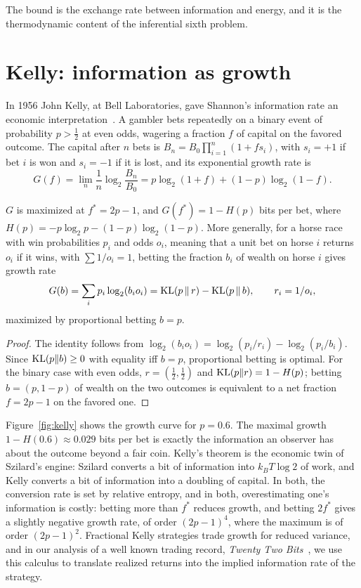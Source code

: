 The bound is the exchange rate between information and energy, and it is the thermodynamic content of the inferential sixth problem.

\section{Kelly: information as growth}

In 1956 John Kelly, at Bell Laboratories, gave Shannon's information rate an economic interpretation~\cite{kelly1956}. A gambler bets repeatedly on a binary event of probability $p>\frac12$ at even odds, wagering a fraction $f$ of capital on the favored outcome. The capital after $n$ bets is $B_n = B_0\prod_{i=1}^n(1+fs_i)$, with $s_i = +1$ if bet $i$ is won and $s_i = -1$ if it is lost, and its exponential growth rate is
\[
G(f) = \lim_n\frac1n\log_2\frac{B_n}{B_0} = p\log_2(1+f)+(1-p)\log_2(1-f).
\]

\begin{theorem}[Kelly]\label{thm:kelly}
$G$ is maximized at $f^* = 2p-1$, and $G(f^*) = 1-H(p)$ bits per bet, where $H(p) = -p\log_2p-(1-p)\log_2(1-p)$. More generally, for a horse race with win probabilities $p_i$ and odds $o_i$, meaning that a unit bet on horse $i$ returns $o_i$ if it wins, with $\sum1/o_i = 1$, betting the fraction $b_i$ of wealth on horse $i$ gives growth rate
\[
G(b) = \sum_ip_i\log_2(b_io_i) = \mathrm{KL}(p\,\|\,r)-\mathrm{KL}(p\,\|\,b),\qquad r_i = 1/o_i,
\]
maximized by proportional betting $b = p$.
\end{theorem}

\begin{proof}
The identity follows from $\log_2(b_io_i) = \log_2(p_i/r_i)-\log_2(p_i/b_i)$. Since $\mathrm{KL}(p\|b)\geq0$ with equality iff $b = p$, proportional betting is optimal. For the binary case with even odds, $r = (\frac12,\frac12)$ and $\mathrm{KL}(p\|r) = 1-H(p)$; betting $b = (p,1-p)$ of wealth on the two outcomes is equivalent to a net fraction $f = 2p-1$ on the favored one.
\end{proof}

Figure~\ref{fig:kelly} shows the growth curve for $p = 0.6$. The maximal growth $1-H(0.6)\approx0.029$ bits per bet is exactly the information an observer has about the outcome beyond a fair coin. Kelly's theorem is the economic twin of Szilard's engine: Szilard converts a bit of information into $k_BT\log2$ of work, and Kelly converts a bit of information into a doubling of capital. In both, the conversion rate is set by relative entropy, and in both, overestimating one's information is costly: betting more than $f^*$ reduces growth, and betting $2f^*$ gives a slightly negative growth rate, of order $(2p-1)^4$, where the maximum is of order $(2p-1)^2$. Fractional Kelly strategies trade growth for reduced variance, and in our analysis of a well known trading record, \emph{Twenty Two Bits}~\cite{polsonsokolov2026twentytwobits}, we use this calculus to translate realized returns into the implied information rate of the strategy.

